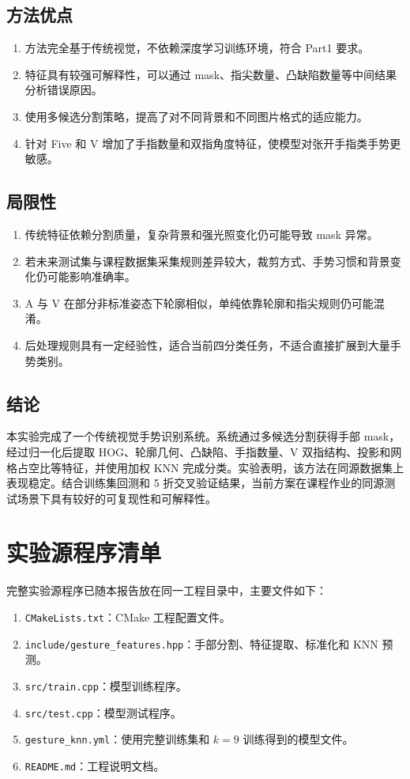 \documentclass[11pt]{article}
\begin{document}
\subsection{方法优点}

\begin{enumerate}
    \item 方法完全基于传统视觉，不依赖深度学习训练环境，符合 Part1 要求。
    \item 特征具有较强可解释性，可以通过 mask、指尖数量、凸缺陷数量等中间结果分析错误原因。
    \item 使用多候选分割策略，提高了对不同背景和不同图片格式的适应能力。
    \item 针对 Five 和 V 增加了手指数量和双指角度特征，使模型对张开手指类手势更敏感。
\end{enumerate}

\subsection{局限性}

\begin{enumerate}
    \item 传统特征依赖分割质量，复杂背景和强光照变化仍可能导致 mask 异常。
    \item 若未来测试集与课程数据集采集规则差异较大，裁剪方式、手势习惯和背景变化仍可能影响准确率。
    \item A 与 V 在部分非标准姿态下轮廓相似，单纯依靠轮廓和指尖规则仍可能混淆。
    \item 后处理规则具有一定经验性，适合当前四分类任务，不适合直接扩展到大量手势类别。
\end{enumerate}

\subsection{结论}

本实验完成了一个传统视觉手势识别系统。系统通过多候选分割获得手部 mask，经过归一化后提取 HOG、轮廓几何、凸缺陷、手指数量、V 双指结构、投影和网格占空比等特征，并使用加权 KNN 完成分类。实验表明，该方法在同源数据集上表现稳定。结合训练集回测和 5 折交叉验证结果，当前方案在课程作业的同源测试场景下具有较好的可复现性和可解释性。

\section{实验源程序清单}

完整实验源程序已随本报告放在同一工程目录中，主要文件如下：

\begin{enumerate}
    \item \texttt{CMakeLists.txt}：CMake 工程配置文件。
    \item \texttt{include/gesture\_features.hpp}：手部分割、特征提取、标准化和 KNN 预测。
    \item \texttt{src/train.cpp}：模型训练程序。
    \item \texttt{src/test.cpp}：模型测试程序。
    \item \texttt{gesture\_knn.yml}：使用完整训练集和 $k=9$ 训练得到的模型文件。
    \item \texttt{README.md}：工程说明文档。
\end{enumerate}
\end{document}

